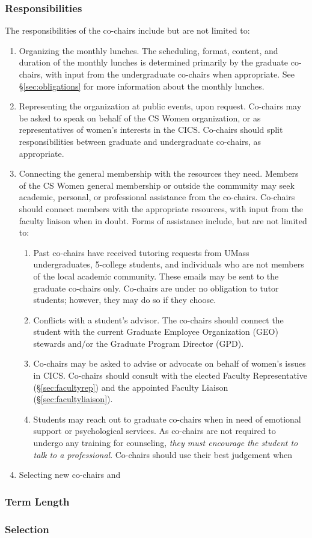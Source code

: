 \subsubsection{Responsibilities}
\label{sec:cochairs_responsibilities}
The responsibilities of the co-chairs include but are not limited to:
\begin{enumerate}
	\item\label{item:lunch} Organizing the monthly lunches. The scheduling, format, content, and duration of the monthly lunches is determined primarily by the graduate co-chairs, with input from the undergraduate co-chairs when appropriate. See \S\ref{sec:obligations} for more information about the monthly lunches.
	\item\label{item:representation} Representing the organization at public events, upon request. Co-chairs may be asked to speak on behalf of the CS Women organization, or as representatives of women's interests in the CICS. Co-chairs should split responsibilities between graduate and undergraduate co-chairs, as appropriate. 
	\item\label{item:connection} Connecting the general membership with the resources they need. Members of the CS Women general membership or outside the community may seek academic, personal, or professional assistance from the co-chairs. Co-chairs should connect members with the appropriate resources, with input from the faculty liaison when in doubt. Forms of assistance include, but are not limited to:
	\begin{enumerate}
	\item\label{item:tutoring} Past co-chairs have received tutoring requests from UMass undergraduates, 5-college students, and individuals who are not members of the local academic community. These emails may be sent to the  graduate co-chairs only. Co-chairs are under no obligation to tutor students; however, they may do so if they choose. 
	\item\label{item:geo} Conflicts with a student's advisor. The co-chairs should connect the student with the current Graduate Employee Organization (GEO) stewards and/or the Graduate Program Director (GPD).
	\item\label{item:womens} Co-chairs may be asked to advise or advocate on behalf of women's issues in CICS. Co-chairs should consult with the elected Faculty Representative (\S\ref{sec:facultyrep}) and the appointed Faculty Liaison (\S\ref{sec:facultyliaison}).
	\item\label{item:psych} Students may reach out to graduate co-chairs when in need of emotional support or psychological services. As co-chairs are not required to undergo any training for counseling, \emph{they must encourage the student to talk to a professional}. Co-chairs should use their best judgement when 
	\end{enumerate}
	\item\label{item:review} Selecting new co-chairs and 
\end{enumerate}

\subsubsection{Term Length}
\label{sec:cochairs_termlength}

\subsubsection{Selection}
\label{sec:cochairs_selection}